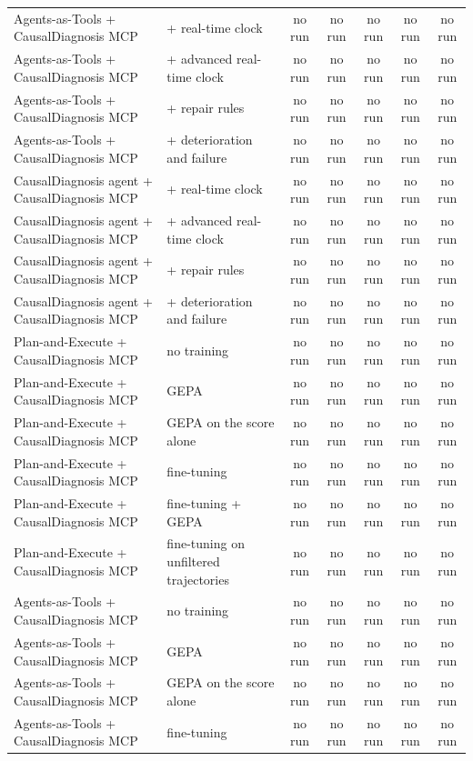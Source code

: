 \documentclass[10pt]{article}
\begin{document}
\begin{table}[H]
\begin{tabular}{llccccc}
Agents-as-Tools + CausalDiagnosis MCP & + real-time clock & no run & no run & no run & no run & no run \\
Agents-as-Tools + CausalDiagnosis MCP & + advanced real-time clock & no run & no run & no run & no run & no run \\
Agents-as-Tools + CausalDiagnosis MCP & + repair rules & no run & no run & no run & no run & no run \\
Agents-as-Tools + CausalDiagnosis MCP & + deterioration and failure & no run & no run & no run & no run & no run \\
CausalDiagnosis agent + CausalDiagnosis MCP & + real-time clock & no run & no run & no run & no run & no run \\
CausalDiagnosis agent + CausalDiagnosis MCP & + advanced real-time clock & no run & no run & no run & no run & no run \\
CausalDiagnosis agent + CausalDiagnosis MCP & + repair rules & no run & no run & no run & no run & no run \\
CausalDiagnosis agent + CausalDiagnosis MCP & + deterioration and failure & no run & no run & no run & no run & no run \\
\midrule
Plan-and-Execute + CausalDiagnosis MCP & no training & no run & no run & no run & no run & no run \\
Plan-and-Execute + CausalDiagnosis MCP & GEPA & no run & no run & no run & no run & no run \\
Plan-and-Execute + CausalDiagnosis MCP & GEPA on the score alone & no run & no run & no run & no run & no run \\
Plan-and-Execute + CausalDiagnosis MCP & fine-tuning & no run & no run & no run & no run & no run \\
Plan-and-Execute + CausalDiagnosis MCP & fine-tuning + GEPA & no run & no run & no run & no run & no run \\
Plan-and-Execute + CausalDiagnosis MCP & fine-tuning on unfiltered trajectories & no run & no run & no run & no run & no run \\
Agents-as-Tools + CausalDiagnosis MCP & no training & no run & no run & no run & no run & no run \\
Agents-as-Tools + CausalDiagnosis MCP & GEPA & no run & no run & no run & no run & no run \\
Agents-as-Tools + CausalDiagnosis MCP & GEPA on the score alone & no run & no run & no run & no run & no run \\
Agents-as-Tools + CausalDiagnosis MCP & fine-tuning & no run & no run & no run & no run & no run \\

\end{tabular}
\end{table}
\end{document}
